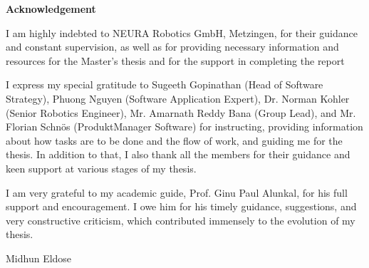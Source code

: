 \documentclass[12pt]{article}
\begin{document}
\newpage
\tableofcontents
\newpage
\listoffigures
{}
\newpage
\listoftables
{}
\newpage
\raggedright
\newpage
\raggedright
{}
\begin{center}
    \textbf{Acknowledgement}
\end{center}
    \raggedright

    I am highly indebted to NEURA Robotics GmbH, Metzingen, for their guidance and constant supervision, as well as for providing necessary information and resources for the Master's thesis and for the support in completing the report

    \vspace{1cm}
    
    I express my special gratitude to Sugeeth Gopinathan (Head of Software Strategy), Phuong Nguyen (Software Application Expert), Dr. Norman Kohler (Senior Robotics Engineer), Mr. Amarnath Reddy Bana (Group Lead), and Mr. Florian Schnös (ProduktManager Software) for instructing, providing information about how tasks are to be done and the flow of work, and guiding me for the thesis. In addition to that, I also thank all the members for their guidance and keen support at various stages of my thesis.

    \vspace{1cm}

    I am very grateful to my academic guide, Prof. Ginu Paul Alunkal, for his full support and encouragement. I owe him for his timely guidance, suggestions, and very constructive criticism, which contributed immensely to the evolution of my thesis.
    
    \vspace{1.5 cm}
    
    \raggedleft
    Midhun Eldose
\end{document}
